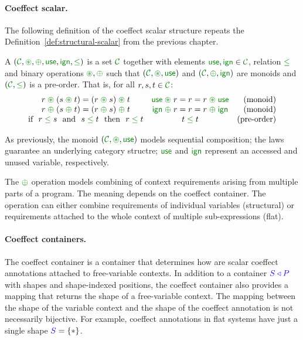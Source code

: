 \paragraph{Coeffect scalar.}
The following definition of the coeffect scalar structure repeats the Definition~\ref{def:structural-scalar}
from the previous chapter.

\begin{definition}
A \emph{} $(\C, \cseq, \cpar, \cunit, \czero, \cleq)$ is a set 
$\C$ together with elements $\cunit, \czero \in \C$, relation $\cleq$ and binary operations 
$\cseq, \cpar$ such that $(\C, \cseq, \cunit)$ and $(\C, \cpar, \czero)$ are monoids and
$(\C, \cleq)$ is a pre-order. That is, for all $r,s,t\in \C$:
%
\begin{equation*}
\begin{array}{ccr}
r \;\cseq\; (s \;\cseq\; t) = (r \;\cseq\; s) \;\cseq\; t  &
\cunit \;\cseq\; r = r = r \;\cseq\; \cunit &
\textnormal{(monoid)}   
\\
r \;\cpar\; (s \;\cpar\; t) = (r \;\cpar\; s) \;\cpar\; t &
\czero \;\cpar\; r = r = r \;\cpar\; \czero &
\textnormal{(monoid)}   
\\
\textnormal{if}~~r\; \cleq\; s ~~\textnormal{and}~~s\; \cleq\; t~~\textnormal{then}~~r\; \cleq\; t&
t\; \cleq\; t &
\textnormal{(pre-order)}   
\end{array}
\end{equation*}
\end{definition}

\noindent
As previously, the monoid $(\C,\cseq,\cunit)$ models sequential composition; the laws guarantee
an underlying category structre; $\cunit$ and $\czero$ represent an accessed and unused variable, 
respectively.

The $\cpar$ operation models combining of context requirements arising from multiple parts of a 
program. The meaning depends on the coeffect container. The operation can either combine requirements
of individual variables (structural) or requirements attached to the whole context of multiple
sub-exp\-ressions (flat).

\paragraph{Coeffect containers.}
The coeffect container is a container that determines how are scalar coeffect annotations attached 
to free-variable contexts. In addition to a container $\SHP$ with shapes and shape-indexed positions, the
coeffect container also provides a mapping that returns the shape of a free-variable context. The
mapping between the shape of the variable context and the shape of the coeffect annotation
is not necessarily bijective. For example, coeffect annotations in flat systems have just a single 
shape $\SH = \{ \ast \}$.

